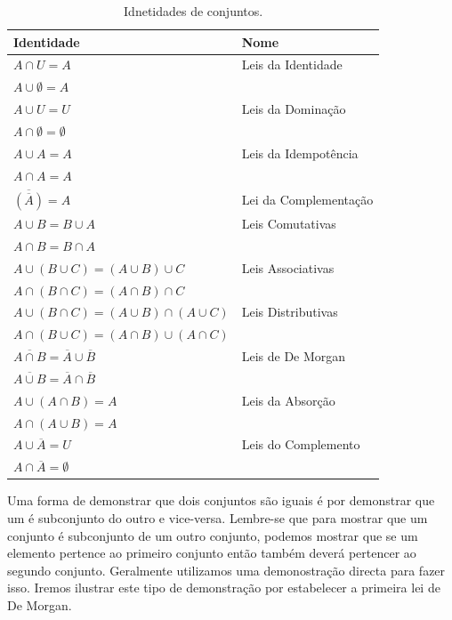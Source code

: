 \begin{table}[H]
	\centering
	\begin{tabular}{|l|l|}%
	\toprule
	\textbf{Identidade} & \textbf{Nome}\\
	\midrule
	$A \cap U = A$ &	Leis da Identidade\\
	$A \cup \emptyset = A$ &	\\
	\midrule
	$A \cup U = U$ &	Leis da Dominação\\
	$A \cap \emptyset = \emptyset$ &\\
	\midrule
	$A \cup A = A$ &	Leis da Idempotência\\
	$A \cap A = A$ &	\\
	\midrule
	$\overline{(\overline{A})} = A$ & Lei da Complementação\\
	\midrule
	$A \cup B = B \cup A$ & Leis Comutativas\\
	$A \cap B = B \cap A$ &\\
	\midrule
	$A \cup (B \cup C) = (A \cup B) \cup C$ & Leis Associativas\\
	$A \cap (B \cap C) = (A \cap B) \cap C$ &\\
	\midrule
	$A \cup (B \cap C) = (A \cup B) \cap (A \cup C)$ & Leis Distributivas
	\\
	$A \cap (B \cup C) = (A \cap B) \cup (A \cap C)$ & \\
	\midrule
	$\overline{A \cap B} = \overline{A} \cup \overline{B}$ & Leis de De Morgan\\
	$\overline{A \cup B} = \overline{A} \cap \overline{B}$ &\\
	\midrule
	$A \cup (A \cap B) = A$ & Leis da Absorção\\
	$A \cap (A \cup B) = A$&\\
	\midrule
	$A \cup \overline{A} = U$ & Leis do Complemento\\
	$A \cap \overline{A} = \emptyset$ &	\\
	\bottomrule%
	\end{tabular}%
	\caption{Idnetidades de conjuntos.}
	\label{tab:31}
\end{table}

Uma forma de demonstrar que dois conjuntos são iguais é por demonstrar que um é
subconjunto do outro e vice-versa. Lembre-se que para mostrar que um conjunto é
subconjunto de um outro conjunto, podemos mostrar que se um elemento pertence ao
primeiro conjunto então também deverá pertencer ao segundo conjunto. Geralmente
utilizamos uma demonostração directa para fazer isso. Iremos ilustrar este tipo
de demonstração por estabelecer a primeira lei de De Morgan.

